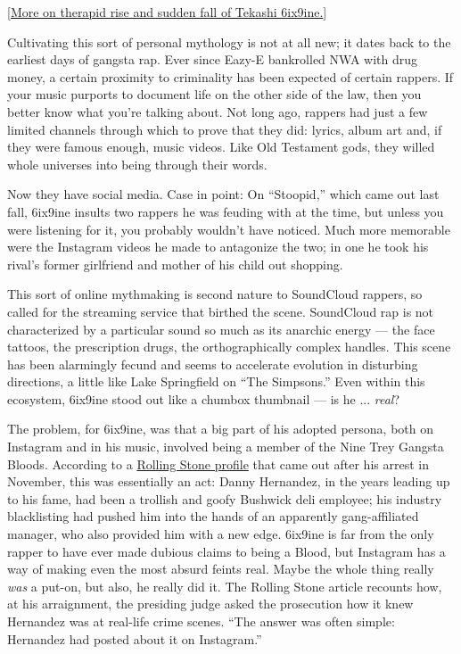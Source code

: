 {[}\href{https://www.nytimes3xbfgragh.onion/2018/11/29/nyregion/tekashi6ix9ine-jail-treyway.html}{More
on
the}\href{https://www.nytimes3xbfgragh.onion/2018/11/29/nyregion/tekashi6ix9ine-jail-treyway.html}{rapid
rise and sudden fall of Tekashi 6ix9ine.}{]}

Cultivating this sort of personal mythology is not at all new; it dates
back to the earliest days of gangsta rap. Ever since Eazy-E bankrolled
NWA with drug money, a certain proximity to criminality has been
expected of certain rappers. If your music purports to document life on
the other side of the law, then you better know what you're talking
about. Not long ago, rappers had just a few limited channels through
which to prove that they did: lyrics, album art and, if they were famous
enough, music videos. Like Old Testament gods, they willed whole
universes into being through their words.

Now they have social media. Case in point: On ``Stoopid,'' which came
out last fall, 6ix9ine insults two rappers he was feuding with at the
time, but unless you were listening for it, you probably wouldn't have
noticed. Much more memorable were the Instagram videos he made to
antagonize the two; in one he took his rival's former girlfriend and
mother of his child out shopping.

This sort of online mythmaking is second nature to SoundCloud rappers,
so called for the streaming service that birthed the scene. SoundCloud
rap is not characterized by a particular sound so much as its anarchic
energy --- the face tattoos, the prescription drugs, the
orthographically complex handles. This scene has been alarmingly fecund
and seems to accelerate evolution in disturbing directions, a little
like Lake Springfield on ``The Simpsons.'' Even within this ecosystem,
6ix9ine stood out like a chumbox thumbnail --- is he ... \emph{real}?

The problem, for 6ix9ine, was that a big part of his adopted persona,
both on Instagram and in his music, involved being a member of the Nine
Trey Gangsta Bloods. According to a
\href{https://www.rollingstone.com/music/music-features/tekashi-69-rise-and-fall-feature-777971/}{Rolling
Stone profile} that came out after his arrest in November, this was
essentially an act: Danny Hernandez, in the years leading up to his
fame, had been a trollish and goofy Bushwick deli employee; his industry
blacklisting had pushed him into the hands of an apparently
gang-affiliated manager, who also provided him with a new edge. 6ix9ine
is far from the only rapper to have ever made dubious claims to being a
Blood, but Instagram has a way of making even the most absurd feints
real. Maybe the whole thing really \emph{was} a put-on, but also, he
really did it. The Rolling Stone article recounts how, at his
arraignment, the presiding judge asked the prosecution how it knew
Hernandez was at real-life crime scenes. ``The answer was often simple:
Hernandez had posted about it on Instagram.''

